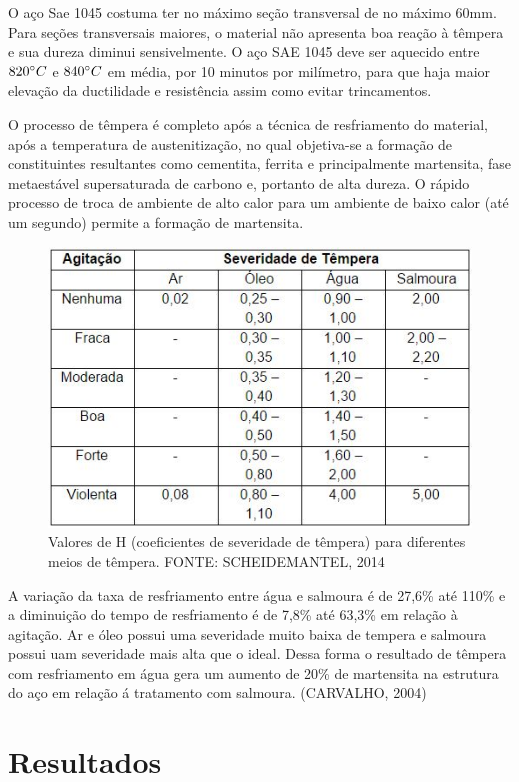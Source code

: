 O aço Sae 1045 costuma ter no máximo seção transversal de no máximo 60mm. Para seções transversais maiores, o material não apresenta boa reação à têmpera e sua dureza diminui sensivelmente. O aço SAE 1045 deve ser aquecido entre $820 \degree C$ e $840 \degree C$ em média, por 10 minutos por milímetro, para que haja maior elevação da ductilidade e resistência assim como evitar trincamentos.

O processo de têmpera é completo após a técnica de resfriamento do material, após a temperatura de austenitização, no qual objetiva-se a formação de constituintes resultantes como cementita, ferrita e principalmente martensita, fase metaestável supersaturada de carbono e, portanto de alta dureza. O rápido processo de troca de ambiente de alto calor para um ambiente de baixo calor (até um segundo) permite a formação de martensita.
\begin{figure}[ht]
	\centering
	\label{tab_valoresH}
	\includegraphics[keepaspectratio=true,scale=0.8]{figuras/tab_valoresH.JPG}
	\caption{Valores de H (coeficientes de severidade de têmpera) para diferentes meios de têmpera. FONTE: SCHEIDEMANTEL, 2014}
\end{figure}

A variação da taxa de resfriamento entre água e salmoura é de 27,6\% até 110\% e a diminuição do tempo de resfriamento é de 7,8\% até 63,3\% em relação à agitação. Ar e óleo possui uma severidade muito baixa de tempera e salmoura possui uam severidade mais alta que o ideal. Dessa forma o resultado de têmpera com resfriamento em água gera um aumento de 20\% de martensita na estrutura do aço em relação á tratamento com salmoura. (CARVALHO, 2004)

\chapter[Resultados]{Resultados}

